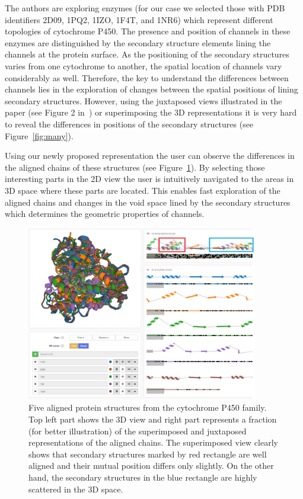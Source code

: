 \documentclass[twocolumn]{bmcart}%
\begin{document}
The authors are exploring enzymes (for our case we selected those with PDB identifiers 2D09, 1PQ2, 1IZO, 1F4T, and 1NR6) which represent different topologies of cytochrome P450. 
The presence and position of channels in these enzymes are distinguished by the secondary structure elements lining the channels at the protein surface. 
As the positioning of the secondary structures varies from one cytochrome to another, the spatial location of channels vary considerably as well.
Therefore, the key to understand the differences between channels lies in the exploration of changes between the spatial positions of lining secondary structures.
However, using the juxtaposed views illustrated in the paper (see Figure 2 in~\cite{Cojocaru2007}) or superimposing the 3D representations it is very hard to reveal the differences in positions of the secondary structures (see Figure~\ref{fig:many}).

Using our newly proposed representation the user can observe the differences in the aligned chains of these structures (see Figure~\ref{fig:five}).
By selecting those interesting parts in the 2D view the user is intuitively navigated to the areas in 3D space where these parts are located.
This enables fast exploration of the aligned chains and changes in the void space lined by the secondary structures which determines the geometric properties of channels.

\begin{figure}[hbt]
  \centering
  \includegraphics[width=0.9\textwidth]{pics/five.png}
  \caption{Five aligned protein structures from the cytochrome P450 family. Top left part shows the 3D view and right part represents a fraction (for better illustration) of the superimposed and juxtaposed representations of the aligned chains. The superimposed view clearly shows that secondary structures marked by red rectangle are well aligned and their mutual position differs only slightly. On the other hand, the secondary structures in the blue rectangle are highly scattered in the 3D space.}
  \label{fig:five}
\end{figure}
\end{document}
